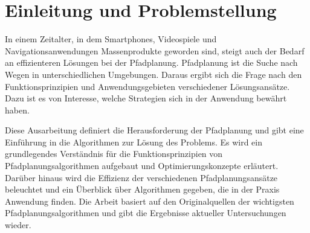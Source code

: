 \pagestyle{plain}
\chapter{Einleitung und Problemstellung}

In einem Zeitalter, in dem Smartphones, Videospiele und Navigationsanwendungen Massenprodukte geworden sind, steigt auch der Bedarf an effizienteren Lösungen bei der Pfadplanung. Pfadplanung ist die Suche nach Wegen in unterschiedlichen Umgebungen. Daraus ergibt sich die Frage nach den Funktionsprinzipien und Anwendungsgebieten verschiedener Lösungsansätze. Dazu ist es von Interesse, welche Strategien sich in der Anwendung bewährt haben. 

Diese Ausarbeitung definiert die Herausforderung der Pfadplanung und gibt eine Einführung in die Algorithmen zur Lösung des Problems. Es wird ein grundlegendes Verständnis für die Funktionsprinzipien von Pfadplanungsalgorithmen aufgebaut und Optimierungskonzepte erläutert. Darüber hinaus wird die Effizienz der verschiedenen Pfadplanungsansätze beleuchtet und ein Überblick über Algorithmen gegeben, die in der Praxis Anwendung finden. Die Arbeit basiert auf den Originalquellen der wichtigsten Pfadplanungsalgorithmen und gibt die Ergebnisse aktueller Untersuchungen wieder.
 

